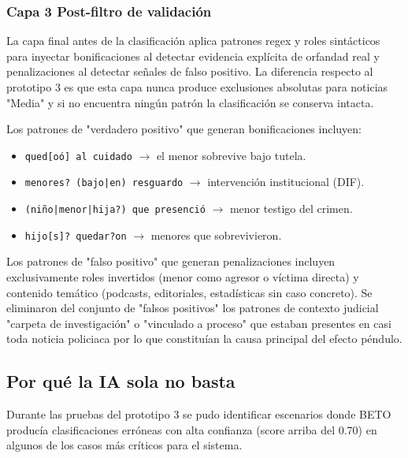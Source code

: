 \subsubsection{Capa 3 Post-filtro de validación}
\label{subsubsec:capa3}

La capa final antes de la clasificación aplica patrones regex y roles
sintácticos para inyectar bonificaciones al detectar evidencia explícita
de orfandad real y penalizaciones al detectar señales de falso positivo.
La diferencia respecto al prototipo 3 es que esta capa nunca produce exclusiones
absolutas para noticias "Media" y si no encuentra ningún patrón la clasificación
se conserva intacta.

Los patrones de "verdadero positivo" que generan bonificaciones incluyen:

\begin{itemize}
    \item \texttt{qued[oó] al cuidado} $\rightarrow$ el menor sobrevive bajo tutela.
    \item \texttt{menores? (bajo|en) resguardo} $\rightarrow$ intervención institucional (DIF).
    \item \texttt{(niño|menor|hija?) que presenció} $\rightarrow$ menor testigo del crimen.
    \item \texttt{hijo[s]? quedar?on} $\rightarrow$ menores que sobrevivieron.
\end{itemize}

Los patrones de "falso positivo" que generan penalizaciones incluyen exclusivamente roles
invertidos (menor como agresor o víctima directa) y contenido temático (podcasts,
editoriales, estadísticas sin caso concreto).
Se eliminaron del conjunto de "falsos positivos" los patrones de contexto judicial
"carpeta de investigación" o "vinculado a proceso" que estaban presentes en casi toda
noticia policiaca por lo que constituían la causa principal del efecto péndulo.


\subsection{Por qué la IA sola no basta}
\label{subsec:tt2_limitaciones_ia}

Durante las pruebas del prototipo 3 se pudo identificar escenarios donde BETO
producía clasificaciones erróneas con alta confianza (score arriba del 0.70)
en algunos de los casos más críticos para el sistema.

